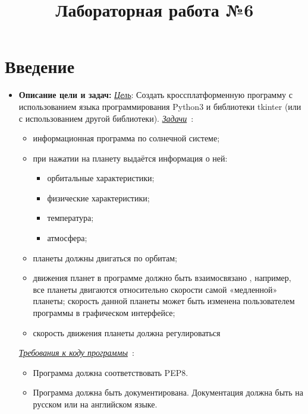\documentclass[14pt, oneside]{altsu-report}
\title{Лабораторная работа №6}
\institute{Институт цифровых технологий, электроники и физики}
\date{\the\year}
\begin{document}
\maketitle

\setcounter{page}{2}
\makeabstract
\tableofcontents

\chapter*{Введение}
\begin{itemize}
    \item \textbf{Описание цели и задач: \newline}
\underline{\textit{Цель}}: Создать кроссплатформенную программу с использованием языка программирования Python3 и библиотеки tkinter (или с использованием другой библиотеки). \newline
\underline{\textit{Задачи}}~\label{zadachi}:
    \begin{itemize}
        \item информационная программа по солнечной системе;
        \item при нажатии на планету выдаётся информация о ней:
            \begin{itemize}
                \item орбитальные характеристики;
                \item физические характеристики;
                \item температура;
                \item атмосфера;
            \end{itemize}
        \item планеты должны двигаться по орбитам;
        \item движения планет в программе должно быть взаимосвязано , например, все планеты двигаются относительно скорости самой «медленной» планеты; скорость данной планеты может быть изменена пользователем программы в графическом интерфейсе;
        \item скорость движения планеты должна регулироваться
    \end{itemize}

\underline{\textit{Требования к коду программы}}~\label{requirement}:
    \begin{itemize}
        \item Программа должна соответствовать PEP8.
        \item Программа должна быть документирована. Документация должна быть на русском или на английском языке.
    \end{itemize}


\end{itemize}
\end{document}

